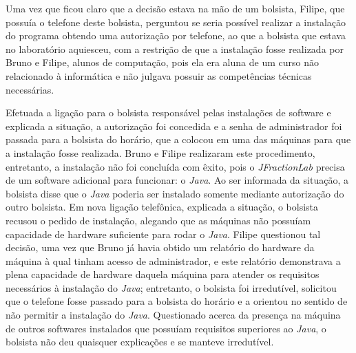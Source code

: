 Uma vez que ficou claro que a decisão estava na mão de um bolsista, Filipe, que possuía o telefone deste bolsista, perguntou se seria possível realizar a instalação do programa obtendo uma autorização por telefone, ao que a bolsista que estava no laboratório aquiesceu, com a restrição de que a instalação fosse realizada por Bruno e Filipe, alunos de computação, pois ela era aluna de um curso não relacionado à informática e não julgava possuir as competências técnicas necessárias.

Efetuada a ligação para o bolsista responsável pelas instalações de software e explicada a situação, a autorização foi concedida e a senha de administrador foi passada para a bolsista do horário, que a colocou em uma das máquinas para que a instalação fosse realizada. Bruno e Filipe realizaram este procedimento, entretanto, a instalação não foi concluída com êxito, pois o \textit{JFractionLab} precisa de um software adicional para funcionar: o \textit{Java}. Ao ser informada da situação, a bolsista disse que o \textit{Java} poderia ser instalado somente mediante autorização do outro bolsista. Em nova ligação telefônica, explicada a situação, o bolsista recusou o pedido de instalação, alegando que as máquinas não possuíam capacidade de hardware suficiente para rodar o \textit{Java}. Filipe questionou tal decisão, uma vez que Bruno já havia obtido um relatório do hardware da máquina à qual tinham acesso de administrador, e este relatório demonstrava a plena capacidade de hardware daquela máquina para atender os requisitos necessários à instalação do \textit{Java}; entretanto, o bolsista foi irredutível, solicitou que o telefone fosse passado para a bolsista do horário e a orientou no sentido de não permitir a instalação do \textit{Java}. Questionado acerca da presença na máquina de outros softwares instalados que possuíam requisitos superiores ao \textit{Java}, o bolsista não deu quaisquer explicações e se manteve irredutível.

